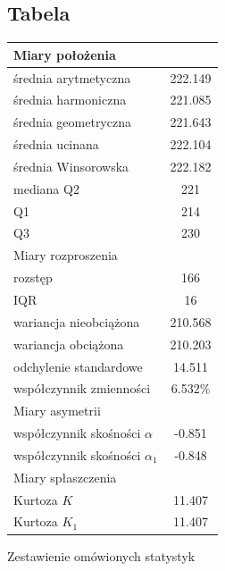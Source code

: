 \documentclass{article}
\theoremstyle{break}
\begin{document}
	\begin{figure}[H]
	\subsection{Tabela}
	\begin{longtable}[c]{| c | c |}
		\hline
		\multicolumn{2}{|l|}{\cellcolor[HTML]{DBDBDB}Miary położenia}    \\ \hline
		\multicolumn{1}{|l|}{średnia arytmetyczna}          & 222.149    \\ \hline
		\multicolumn{1}{|l|}{średnia harmoniczna}           & 221.085    \\ \hline
		\multicolumn{1}{|l|}{średnia geometryczna}          & 221.643    \\ \hline
		\multicolumn{1}{|l|}{średnia ucinana}               & 222.104    \\ \hline
		\multicolumn{1}{|l|}{średnia Winsorowska}           & 222.182    \\ \hline
		\multicolumn{1}{|l|}{mediana Q2}                    & 221        \\ \hline
		\multicolumn{1}{|l|}{Q1}                            & 214        \\ \hline
		\multicolumn{1}{|l|}{Q3}                            & 230        \\ \hline
		\multicolumn{2}{|l|}{\cellcolor[HTML]{DBDBDB}Miary rozproszenia} \\ \hline
		\multicolumn{1}{|l|}{rozstęp}                       & 166        \\ \hline
		\multicolumn{1}{|l|}{IQR}                           & 16         \\ \hline
		\multicolumn{1}{|l|}{wariancja nieobciążona}        & 210.568    \\ \hline
		\multicolumn{1}{|l|}{wariancja obciążona}           & 210.203    \\ \hline
		\multicolumn{1}{|l|}{odchylenie standardowe}        & 14.511     \\ \hline
		\multicolumn{1}{|l|}{współczynnik zmienności}       & 6.532\%      \\ \hline
		\multicolumn{2}{|l|}{\cellcolor[HTML]{DBDBDB}Miary asymetrii}    \\ \hline
		\multicolumn{1}{|l|}{współczynnik skośności $\alpha$}  & -0.851    \\ \hline
		\multicolumn{1}{|l|}{współczynnik skośności $\alpha_1$}& -0.848     \\ \hline
		\multicolumn{2}{|l|}{\cellcolor[HTML]{DBDBDB}Miary spłaszczenia} \\ \hline
		\multicolumn{1}{|l|}{Kurtoza $K$}                       & 11.407     \\ \hline
		\multicolumn{1}{|l|}{Kurtoza $K_1$}                     & 11.407      \\ \hline
	\end{longtable}
	\caption{Zestawienie omówionych statystyk}
	\end{figure}
	
\end{document}
